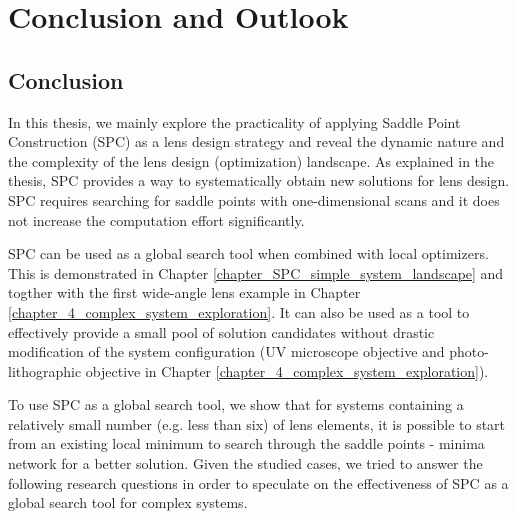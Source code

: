 \chapter{Conclusion and Outlook} %
\label{chapter_Conclusion} %
\graphicspath{ {./chapter-6/figures/} }  %
\captionsetup[figure]{labelfont=bf}
\captionsetup{margin=1.5em}
\captionsetup[table]{labelfont=bf}


\begin{comment}


\epigraph[0pt]{
Nel mezzo del cammin di nostra vita
mi ritrovai per una selva oscura,
che la diritta via era smarrita.

In the midst of life's journey
I found myself in a dark wood
where the right path was lost.

}{First stanza of Dante's Inferno}

\end{comment}
\section{Conclusion}
In this thesis, we mainly explore the practicality of applying  Saddle Point Construction (SPC) as a lens design strategy and reveal the dynamic nature and the complexity of the lens design (optimization) landscape.  As explained in the thesis, SPC provides a way to systematically obtain new solutions for lens design. SPC requires searching for saddle points with one-dimensional scans and it does not increase the computation effort significantly. 

SPC can be used as a global search tool when combined with local optimizers. This is demonstrated in Chapter \ref{chapter_SPC_simple_system_landscape} and togther with the first wide-angle lens example in Chapter \ref{chapter_4_complex_system_exploration}. It can also be used as a tool to effectively provide a small pool of solution candidates without drastic modification of the system configuration (UV microscope objective and photo-lithographic objective in Chapter \ref{chapter_4_complex_system_exploration}). 

To use SPC as a global search tool, we show that for systems containing a relatively small number (e.g. less than six) of lens elements, it is possible to start from an existing local minimum to search through the saddle points - minima network for a better solution. Given the studied cases, we tried to answer the following research questions in order to speculate on the effectiveness of SPC as a global search tool for complex systems. 

